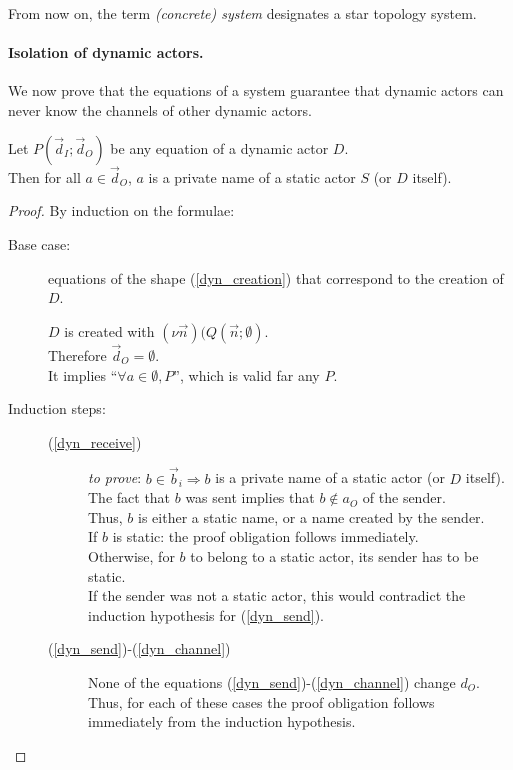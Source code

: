 \documentclass[a4paper]{report}
\numberwithin{algorithm}{chapter}
\begin{document}
\begin{rem}
From now on, the term \emph{(concrete) system} designates a star topology system.
\end{rem}

\paragraph{Isolation of dynamic actors.}
We now prove that the equations of a system guarantee that dynamic actors can never know the channels of other dynamic actors.

\begin{thm}
\label{thmIsolated}
Let $P(\vec d_I; \vec d_O)$ be any equation of a dynamic actor $D$.\\
Then for all $a \in \vec d_O$, $a$ is a private name of a static actor $S$ (or $D$ itself).
\end{thm}
\begin{proof}
By induction on the formulae:
\begin{description}
\item[Base case:] equations of the shape (\ref{dyn_creation}) that correspond to the creation of $D$.

$D$ is created with $(\nu \vec n)(Q(\vec n;\emptyset)$.\\
Therefore $\vec d_O = \emptyset$.\\
It implies ``$\forall a \in \emptyset, P$'', which is valid far any $P$.

\item[Induction steps:]
\mbox{}
\begin{description}
\item[(\ref{dyn_receive})] \emph{to prove}: $b \in \vec b_i \Rightarrow b$ is a private name of a static actor (or $D$ itself).\\
The fact that $b$ was sent implies that $b \notin a_O$ of the sender.\\
Thus, $b$ is either a static name, or a name created by the sender.\\
If $b$ is static: the proof obligation follows immediately.\\
Otherwise, for $b$ to belong to a static actor, its sender has to be static.\\
If the sender was not a static actor, this would contradict the induction hypothesis for (\ref{dyn_send}).

\item[(\ref{dyn_send})-(\ref{dyn_channel})]
None of the equations (\ref{dyn_send})-(\ref{dyn_channel}) change $d_O$.
Thus, for each of these cases the proof obligation follows immediately from the induction hypothesis.
\end{description}

\end{description}
\end{proof}
\end{document}
